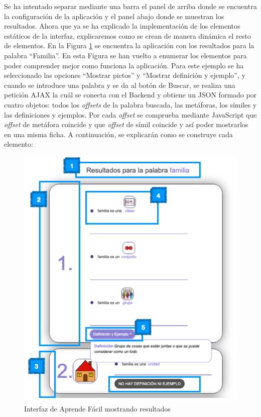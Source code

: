 Se ha intentado separar mediante una barra el panel de arriba donde se encuentra la configuración de la aplicación y el panel abajo donde se muestran los resultados. 
Ahora que ya se ha explicado la implementación de los elementos estáticos de la interfaz, explicaremos como se crean de manera dinámica el resto de elementos.
En la Figura \ref{fig:paginaResultado} se encuentra la aplicación con los resultados para la palabra ``Familia''. En esta Figura se han vuelto a enumerar los elementos para poder comprender mejor como funciona la aplicación. 
Para este ejemplo se ha seleccionado las opciones ``Mostrar pictos'' y ``Mostrar definición y ejemplo'', y cuando se introduce una palabra y se da al botón de Buscar, se realiza una petición AJAX la cuál se conecta con el Backend y obtiene un JSON formado por cuatro objetos: todos los \textit{offsets} de la palabra buscada, las metáforas, los símiles y las definiciones y ejemplos. Por cada \textit{offset} se comprueba mediante JavaScript que \textit{offset} de metáfora coincide y que \textit{offset} de símil coincide y así poder mostrarlos en una misma ficha.
A continuación, se explicarán como se construye cada elemento:


\begin{figure}[!h]
	\includegraphics[width=.9\textwidth]{Imagenes/Bitmap/Capitulo4/Frontend/paginaResultado.png}
	\centering
	\caption{Interfaz de Aprende Fácil mostrando resultados }
	\label{fig:paginaResultado}
\end{figure}


